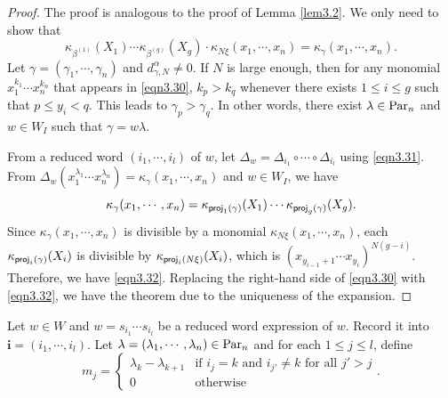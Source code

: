 \documentclass[12pt]{amsart}
\theoremstyle{definition}
\theoremstyle{remark}
\newcommand{\Parn}{{\rm Par}_n}
\begin{document}
\begin{proof}
The proof is analogous to the proof of Lemma \ref{lem3.2}. We only need to show that
\begin{equation}\label{eqn3.32}
\kappa_{\beta^{(1)}} (X_1) \cdots \kappa_{\beta^{(g)}}(X_g) \cdot \kappa_{N\xi} (x_1 , \cdots , x_n) = \kappa_{\gamma} (x_1 , \cdots , x_n).
\end{equation}
Let $\gamma = (\gamma_1 , \cdots , \gamma_n)$ and $d_{\gamma , N}^\alpha \neq 0$. If $N$ is large enough, then for any monomial $x_1^{k_1} \cdots x_n^{k_n}$ that appears in \eqref{eqn3.30}, $k_p > k_q$ whenever there exists $1 \leq i \leq g$ such that $p \leq y_i < q$. This leads to $\gamma_p > \gamma_q$. In other words, there exist $\lambda \in \Parn$ and $w \in W_I$ such that $\gamma = w\lambda$.

From a reduced word $(i_1 , \cdots ,i_l)$ of $w$, let $\Delta_w = \Delta_{i_1} \circ \cdots \circ \Delta_{i_l}$ using \eqref{eqn3.31}. From $\Delta_w (x_1^{\lambda_1} \cdots x_n^{\lambda_n}) = \kappa_\gamma (x_1 , \cdots , x_n)$ and $w \in W_I$, we have
\begin{equation}
\kappa_\gamma (x_1 , \cdots , x_n) = \kappa_{{\sf proj}_1 (\gamma) }(X_1) \cdots \kappa_{{\sf proj}_g (\gamma) }(X_g).
\end{equation}
Since $\kappa_\gamma (x_1 , \cdots , x_n)$ is divisible by a monomial $\kappa_{N \xi} (x_1 , \cdots , x_n)$, each $\kappa_{{\sf proj}_i (\gamma) }(X_i)$ is divisible by $\kappa_{{\sf proj}_i (N\xi) }(X_i)$, which is $(x_{y_{i-1}+1} \cdots x_{y_i})^{N(g-i)}$. Therefore, we have \eqref{eqn3.32}. Replacing the right-hand side of \eqref{eqn3.30} with \eqref{eqn3.32}, we have the theorem due to the uniqueness of the expansion.
\end{proof}

Let $w \in W$ and $w = s_{i_1} \cdots s_{i_l}$ be a reduced word expression of $w$. Record it into $\mathbf{i} = (i_1 , \cdots, i_l)$. Let $\lambda =(\lambda_1 , \cdots , \lambda_n) \in \Parn$ and for each $1 \leq j \leq l$, define
\begin{equation}\label{eqn4.3}
m_j =
\begin{cases}
\lambda_k - \lambda_{k+1} & \text{if }i_j = k \text{ and }i_{j'} \neq k \text{ for all }j' > j \\
0 & \text{otherwise}
\end{cases}
.
\end{equation}
\end{document}
